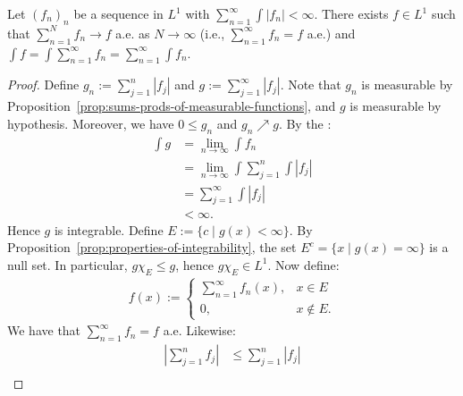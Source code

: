 \begin{theorem}\label{thm:interchange-inf-series-and-int}
    Let $(f_n)_n$ be a sequence in $L^1$ with $\sum_{n = 1}^\infty \int |f_n| < \infty$. There exists $f \in L^1$ such that $\sum_{n = 1}^N f_n \rightarrow f$ a.e. as $N \rightarrow \infty$ (i.e., $\sum_{n = 1}^\infty f_n = f$ a.e.) and $\int f = \int \sum_{n = 1}^\infty f_n = \sum_{n= 1}^\infty \int f_n$.
\end{theorem}
    \begin{proof}
        Define $g_n := \sum_{j = 1}^n |f_j|$ and $ g:= \sum_{j = 1}^\infty |f_j|$. Note that $g_n$ is measurable by Proposition~\ref{prop:sums-prods-of-measurable-functions}, and $g$ is measurable by hypothesis. Moreover, we have $0 \leq g_n$ and $g_n \nearrow g$. By the :
            \begin{equation*}
            \begin{split}
                \int g 
                & = \lim_{n \rightarrow \infty}\int f_n \\
                & = \lim_{n \rightarrow \infty}\int \sum_{j = 1}^n \int |f_j| \\
                & = \sum_{j = 1}^\infty \int |f_j| \\
                & < \infty.
            \end{split}
            \end{equation*}
        Hence $g$ is integrable. Define $E := \{c \mid g(x) < \infty\}$. By Proposition~\ref{prop:properties-of-integrability}, the set $E^c =\{x \mid g(x) = \infty\}$ is a null set. In particular, $g \chi_E \leq g$, hence $g \chi_E \in L^1$. Now define:
            \begin{equation*}
            \begin{split}
                f(x) 
                := \begin{cases}
                    \sum_{n = 1}^\infty f_n(x), & x \in E \\
                    0, & x \not\in E.
                \end{cases}
            \end{split}
            \end{equation*}
        We have that $\sum_{n = 1}^\infty f_n = f$ a.e. Likewise:
            \begin{equation*}
            \begin{split}
                \left|\sum_{j = 1}^n f_j\right| 
                & \leq \sum_{j = 1}^n |f_j| \\

\end{split}
\end{equation*}
\end{proof}
